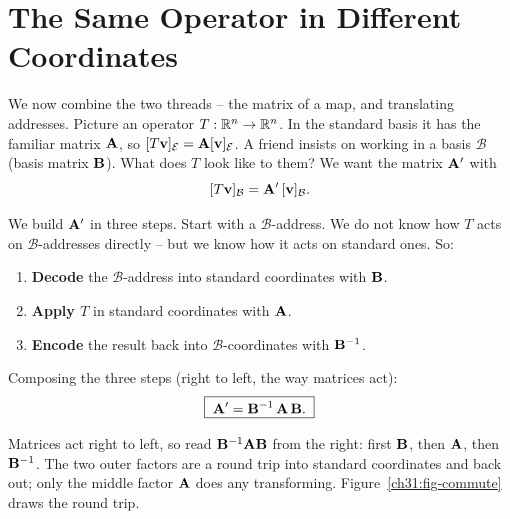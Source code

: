 \section{The Same Operator in Different Coordinates}
\label{ch31:same-operator}

We now combine the two threads -- the matrix of a map, and translating
addresses. Picture an
operator $T:\mathbb{R}^n\to\mathbb{R}^n$. In the standard basis it has the familiar matrix
$\mathbf{A}$, so $[T\mathbf{v}]_{\mathcal{E}}=\mathbf{A}[\mathbf{v}]_{\mathcal{E}}$. A friend
insists on working in a basis $\mathcal{B}$ (basis matrix $\mathbf{B}$). What does
$T$ look like to them? We want the matrix $\mathbf{A}'$ with
\[
  [T\mathbf{v}]_{\mathcal{B}} = \mathbf{A}'\,[\mathbf{v}]_{\mathcal{B}}.
\]

We build $\mathbf{A}'$ in three steps.
Start with a $\mathcal{B}$-address. We do not know how $T$ acts
on $\mathcal{B}$-addresses directly -- but we know how it acts on standard ones.
So:
\begin{enumerate}
  \item \textbf{Decode} the $\mathcal{B}$-address into standard coordinates with
        $\mathbf{B}$.
  \item \textbf{Apply $T$} in standard coordinates with $\mathbf{A}$.
  \item \textbf{Encode} the result back into $\mathcal{B}$-coordinates with
        $\mathbf{B}^{-1}$.
\end{enumerate}
Composing the three steps (right to left, the way matrices act):
\[
  \boxed{\;\mathbf{A}' = \mathbf{B}^{-1}\,\mathbf{A}\,\mathbf{B}.\;}
\]

\begin{intuitionbox}
Matrices act right to left, so read $\mathbf{B}^{-1}\mathbf{A}\mathbf{B}$ from the right:
first $\mathbf{B}$, then $\mathbf{A}$, then $\mathbf{B}^{-1}$. The two outer factors are a
round trip into standard coordinates and back out; only the middle factor
$\mathbf{A}$ does any transforming. Figure~\ref{ch31:fig-commute} draws the round trip.
\end{intuitionbox}

